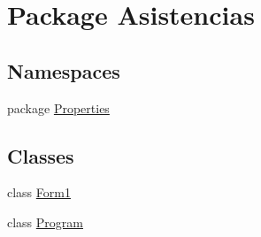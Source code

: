 \hypertarget{namespace_asistencias}{\section{Package Asistencias}
\label{namespace_asistencias}
}
\subsection*{Namespaces}
\begin{DoxyCompactItemize}
\item 
package \hyperlink{namespace_asistencias_1_1_properties}{Properties}
\end{DoxyCompactItemize}
\subsection*{Classes}
\begin{DoxyCompactItemize}
\item 
class \hyperlink{class_asistencias_1_1_form1}{Form1}
\item 
class \hyperlink{class_asistencias_1_1_program}{Program}
\end{DoxyCompactItemize}

